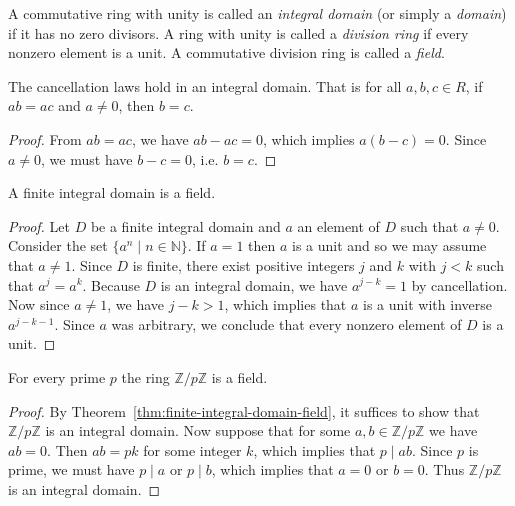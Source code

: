 \begin{definition}
    A commutative ring with unity is called an \emph{integral domain} (or simply a \emph{domain}) if it has no zero divisors. A ring with unity is called a \emph{division ring} if every nonzero element is a unit. A commutative division ring is called a \emph{field}.
\end{definition}

\begin{theorem}
    The cancellation laws hold in an integral domain. That is for all \(a, b, c \in R\), if \(ab = ac\) and \(a \neq 0\), then \(b = c\).
\end{theorem}

\begin{proof}
    From \(ab = ac\), we have \(ab - ac = 0\), which implies \(a(b - c) = 0\). Since \(a \neq 0\), we must have \(b - c = 0\), i.e. \(b = c\).
\end{proof}

\begin{theorem}
    A finite integral domain is a field.
    \label{thm:finite-integral-domain-field}
\end{theorem}

\begin{proof}
    Let \(D\) be a finite integral domain and \(a\) an element of \(D\) such that \(a \neq 0\). Consider the set \(\{a^n \mid n \in \mathbb{N}\}\). If \(a = 1\) then \(a\) is a unit and so we may assume that \(a \neq 1\). Since \(D\) is finite, there exist positive integers \(j\) and \(k\) with \(j < k\) such that \(a^j = a^k\). Because \(D\) is an integral domain, we have \(a^{j-k} = 1\) by cancellation. Now since \(a \neq 1\), we have \(j - k > 1\), which implies that \(a\) is a unit with inverse \(a^{j-k-1}\). Since \(a\) was arbitrary, we conclude that every nonzero element of \(D\) is a unit.
\end{proof}

\begin{theorem}
    For every prime \(p\) the ring \(\mathbb{Z}/p\mathbb{Z}\) is a field.
\end{theorem}

\begin{proof}
    By Theorem~\ref{thm:finite-integral-domain-field}, it suffices to show that \(\mathbb{Z}/p\mathbb{Z}\) is an integral domain. Now suppose that for some \(a, b \in \mathbb{Z}/p\mathbb{Z}\) we have \(ab = 0\). Then \(ab = pk\) for some integer \(k\), which implies that \(p \mid ab\). Since \(p\) is prime, we must have \(p \mid a\) or \(p \mid b\), which implies that \(a = 0\) or \(b = 0\). Thus \(\mathbb{Z}/p\mathbb{Z}\) is an integral domain.
\end{proof}

